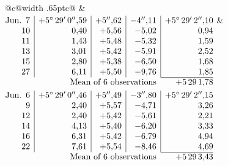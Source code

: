 \noindent\begin{tabular}{@{}c@{\hspace{.4em}\vrule width .65pt\hspace{.4em}}c@{}}
 &
 \\[.18ex]
\(\begin{array}[t]{@{}r|r|r|r|r@{}}
\text{Jun.}\enspace 7 & +5^\circ\,29'\,0''{,}59 & +5''{,}62 & -4''{,}11 & +5^\circ\,29'\,2''{,}10\\
10 & 0{,}40 & +5{,}56 & -5{,}02 & 0{,}94\\
11 & 1{,}43 & +5{,}48 & -5{,}32 & 1{,}59\\
13 & 3{,}01 & +5{,}42 & -5{,}91 & 2{,}52\\
15 & 2{,}80 & +5{,}38 & -6{,}50 & 1{,}68\\
27 & 6{,}11 & +5{,}50 & -9{,}76 & 1{,}85\\
\cline{5-5}
\multicolumn{4}{r}{\text{Mean of 6 observations}} & +5\,29\,1{,}78
\end{array}\)
&
\(\begin{array}[t]{@{}r|r|r|r|r@{}}
\text{Jun.}\enspace 6 & +5^\circ\,29'\,0''{,}46 & +5''{,}49 & -3''{,}80 & +5^\circ\,29'\,2''{,}15\\
9 & 2{,}40 & +5{,}57 & -4{,}71 & 3{,}26\\
12 & 2{,}40 & +5{,}42 & -5{,}61 & 2{,}21\\
14 & 4{,}13 & +5{,}40 & -6{,}20 & 3{,}33\\
16 & 6{,}31 & +5{,}42 & -6{,}79 & 4{,}94\\
22 & 7{,}61 & +5{,}54 & -8{,}46 & 4{,}69\\
\cline{5-5}
\multicolumn{4}{r}{\text{Mean of 6 observations}} & +5\,29\,3{,}43
\end{array}\)
\end{tabular}\par\medskip

\par
\endgroup

